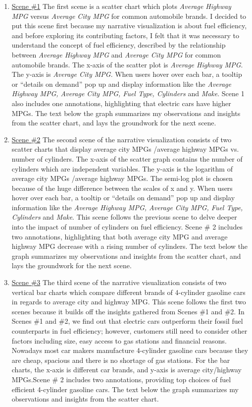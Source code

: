\documentclass[11pt]{article}
\begin{document}
\begin{enumerate}
	\item \underline{Scene \#1}
	The first scene is a scatter chart which plots \textit{Average Highway MPG} versus \textit{Average City MPG} for common automobile brands. I decided to put this scene first because my narrative visualization is about fuel efficiency, and before exploring its contributing factors, I felt that it was necessary to understand the concept of fuel efficiency, described by the relationship between \textit{Average Highway MPG} and \textit{Average City MPG} for common automobile brands. The x-axis of the scatter plot is \textit{Average Highway MPG}. The y-axis is \textit{Average City MPG}. When users hover over each bar, a tooltip or “details on demand” pop up and display information like the \textit{Average Highway MPG, Average City MPG, Fuel Type, Cylinders} and \textit{Make}.
	Scene 1 also includes one annotations, highlighting that electric cars have higher MPGs. The text below the graph summarizes my observations and insights from the scatter chart, and lays the groundwork for the next scene.
	
	\item \underline{Scene \#2}
	The second scene of the narrative visualization consists of two scatter charts that display average city MPGs /average highway MPGs vs. number of cylinders. The x-axis of the scatter graph contains the number of cylinders which are independent variables. The y-axis is the logarithm of average city MPGs /average highway MPGs. The semi-log plot is chosen because of the huge difference between the scales of x and y. When users hover over each bar, a tooltip or “details on demand” pop up and display information like the \textit{Average Highway MPG, Average City MPG, Fuel Type, Cylinders} and  \textit{Make}. This scene follows the previous scene to delve deeper into the impact of number of cylinders on fuel efficiency. Scene \# 2 includes two annotations, highlighting that both average city MPG and average highway MPG decrease with a rising number of cylinders. The text below the graph summarizes my observations and insights from the scatter chart, and lays the groundwork for the next scene.
	
	\item \underline{Scene \#3}
	The third scene of the narrative visualization consists of two vertical bar charts which compare different brands of 4-cylinder gasoline cars in regards to  average city and highway MPG.  This scene follows the first two scenes because it builds off the insights gathered from Scenes \#1 and \#2. In Scenes \#1 and \#2, we find out that electric cars outperform their fossil fuel counterparts in fuel efficiency; however,  customers still need to consider other factors including size, easy access to gas stations and financial reasons. Nowadays most car makers manufacture 4-cylinder gasoline cars because they are cheap, spacious and there is no shortage of gas stations. For the bar charts, the x-axis is different car brands, and y-axis is average city/highway MPGs.Scene \# 2 includes two annotations, providing top choices of fuel efficient 4-cylinder gasoline cars. The text below the graph summarizes my observations and insights from the scatter chart.
	

\end{enumerate}
\end{document}
